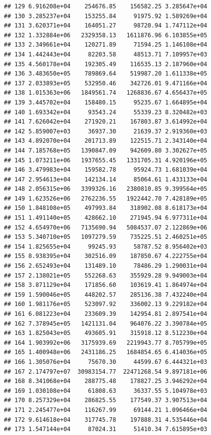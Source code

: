 \documentclass[
]{article}
\begin{document}
\begin{verbatim}
## 129 6.916208e+04    254676.85    156582.25 3.285647e+04
## 130 3.285237e+04    153255.84     91975.92 1.589269e+04
## 131 3.620371e+04    164051.27     98720.94 1.747112e+04
## 132 1.332884e+06   2329358.13   1611876.96 6.103855e+05
## 133 2.349661e+04    120271.89     71594.25 1.146108e+04
## 134 1.442443e+04     82203.58     48513.71 7.109957e+03
## 135 4.560178e+04    192305.49    116535.13 2.187960e+04
## 136 3.483650e+05    789869.64    519987.20 1.611338e+05
## 137 2.033893e+05    532950.46    342726.01 9.471166e+04
## 138 1.015363e+06   1849561.74   1268836.67 4.656437e+05
## 139 3.445702e+04    158480.15     95235.67 1.664895e+04
## 140 1.693342e+04     93543.24     55339.23 8.320482e+03
## 141 7.626042e+04    271920.21    167803.87 3.614992e+04
## 142 5.859007e+03     36937.30     21639.37 2.919360e+03
## 143 4.892070e+04    201713.89    122515.71 2.343140e+04
## 144 7.185768e+05   1390847.09    942609.80 3.302627e+05
## 145 1.073211e+06   1937655.45   1331705.31 4.920196e+05
## 146 3.479983e+04    159582.78     95924.73 1.681039e+04
## 147 2.954613e+04    142134.14     85064.61 1.433133e+04
## 148 2.056315e+06   3399326.16   2380810.85 9.399564e+05
## 149 1.623526e+06   2762236.55   1922442.70 7.428189e+05
## 150 1.848108e+05    497993.84    318902.08 8.618173e+04
## 151 1.491140e+05    428662.10    271945.94 6.977311e+04
## 152 4.654970e+06   7135690.94   5084537.07 2.122869e+06
## 153 5.340710e+05   1097279.59    735225.51 2.460251e+05
## 154 1.825655e+04     99245.93     58787.52 8.956402e+03
## 155 8.938395e+04    302516.09    187850.67 4.222755e+04
## 156 2.652493e+04    131489.10     78486.29 1.290031e+04
## 157 2.138021e+05    552268.63    355929.28 9.949003e+04
## 158 3.871129e+04    171856.60    103619.41 1.864974e+04
## 159 1.590046e+05    448202.57    285136.38 7.432240e+04
## 160 1.981176e+05    523097.92    336002.13 9.229182e+04
## 161 6.081223e+04    233609.39    142954.81 2.897541e+04
## 162 7.378945e+05   1421131.04    964076.22 3.390784e+05
## 163 1.825043e+05    493605.91    315918.12 8.512230e+04
## 164 1.903992e+06   3175939.69   2219943.77 8.705799e+05
## 165 1.400948e+06   2431186.25   1684854.65 6.414036e+05
## 166 1.305076e+04     75670.30     44599.67 6.444321e+03
## 167 2.174797e+07  30983154.77  22471268.54 9.897181e+06
## 168 8.341068e+04    288775.48    178827.25 3.946292e+04
## 169 1.030108e+04     61808.63     36337.55 5.104978e+03
## 170 8.257329e+04    286825.55    177549.37 3.907513e+04
## 171 2.245477e+04    116267.99     69144.21 1.096466e+04
## 172 9.614618e+04    317745.78    197888.31 4.535446e+04
## 173 1.547144e+04     87024.31     51410.34 7.615895e+03

\end{verbatim}
\end{document}
